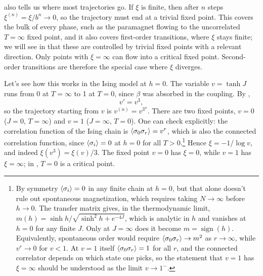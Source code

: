  also tells us where most trajectories go. If $\xi$ is
finite, then after $n$ steps $\xi^{(n)}=\xi/b^n\to0$, so the trajectory must end
at a trivial fixed point. This covers the bulk of every phase, such as the
paramagnet flowing to the uncorrelated $T=\infty$ fixed point, and it also covers
first-order transitions, where $\xi$ stays finite; we will see in
 that these are controlled by trivial fixed points
with a relevant direction. Only points with $\xi=\infty$ can flow into a critical
fixed point. Second-order transitions are therefore the special case where $\xi$
diverges.

Let's see how this works in the  Ising model at $h=0$. The variable
$v=\tanh J$ runs from 0 at $T=\infty$ to 1 at $T=0$, since $\beta$
was absorbed in the coupling. By ,
\begin{equation}
  v'=v^3,
\end{equation}
so the trajectory starting from $v$ is $v^{(n)}=v^{3^n}$. There are two
fixed points, $v=0$ ($J=0$, $T=\infty$) and $v=1$ ($J=\infty$, $T=0$). One can
check  explicitly: the correlation function of the  Ising
chain is $\ev{\sigma_0\sigma_r}=v^r$, which is also the connected correlation
function, since $\ev{\sigma_i}=0$ at $h=0$ for all $T>0$.\footnote{By symmetry
$\ev{\sigma_i}=0$ in any finite chain at $h=0$, but that alone doesn't rule out
spontaneous magnetization, which requires taking $N\to\infty$ before $h\to0$.
The transfer matrix gives, in the thermodynamic limit,
$m(h)=\sinh h/\sqrt{\sinh^2h+e^{-4J}}$, which is analytic in $h$ and vanishes at
$h=0$ for any finite $J$. Only at $J=\infty$ does it become
$m=\operatorname{sign}(h)$. Equivalently, spontaneous order would require
$\ev{\sigma_0\sigma_r}\to m^2$ as $r\to\infty$, while $v^r\to0$ for $v<1$.
At $v=1$ itself $\ev{\sigma_0\sigma_r}=1$ for all $r$, and the connected
correlator depends on which state one picks, so the statement that $v=1$ has
$\xi=\infty$ should be understood as the limit $v\to1^-$.}
Hence $\xi=-1/\log v$, and indeed
$\xi(v^3)=\xi(v)/3$. The fixed point $v=0$ has $\xi=0$, while $v=1$ has
$\xi=\infty$; in , $T=0$ is a critical point.

